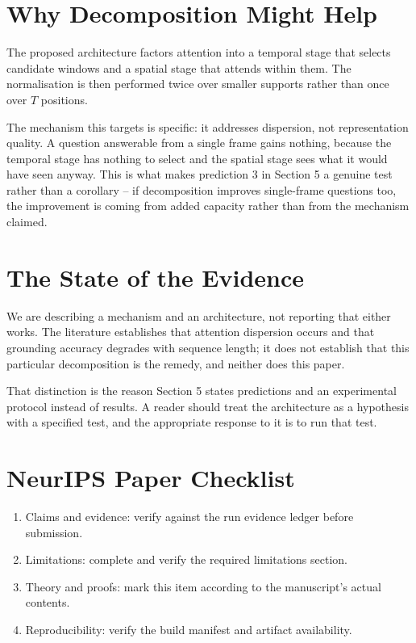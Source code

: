 \documentclass{article}
\begin{document}
\section{Why Decomposition Might Help}


The proposed architecture factors attention into a temporal stage that selects candidate windows and a spatial stage that attends within them. The normalisation is then performed twice over smaller supports rather than once over $T$ positions.

The mechanism this targets is specific: it addresses dispersion, not representation quality. A question answerable from a single frame gains nothing, because the temporal stage has nothing to select and the spatial stage sees what it would have seen anyway. This is what makes prediction 3 in Section 5 a genuine test rather than a corollary -- if decomposition improves single-frame questions too, the improvement is coming from added capacity rather than from the mechanism claimed.


\section{The State of the Evidence}


We are describing a mechanism and an architecture, not reporting that either works. The literature establishes that attention dispersion occurs and that grounding accuracy degrades with sequence length; it does not establish that this particular decomposition is the remedy, and neither does this paper.

That distinction is the reason Section 5 states predictions and an experimental protocol instead of results. A reader should treat the architecture as a hypothesis with a specified test, and the appropriate response to it is to run that test.








\section*{NeurIPS Paper Checklist}
\begin{enumerate}
  \item Claims and evidence: verify against the run evidence ledger before submission.
  \item Limitations: complete and verify the required limitations section.
  \item Theory and proofs: mark this item according to the manuscript's actual contents.
  \item Reproducibility: verify the build manifest and artifact availability.
\end{enumerate}
\end{document}
